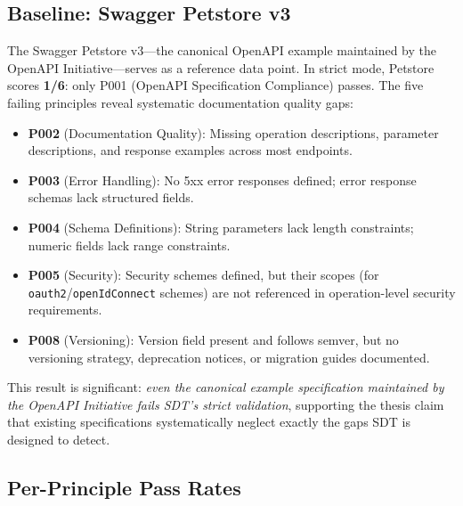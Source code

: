 \subsection{Baseline: Swagger Petstore v3}
\label{subsec:petstore-baseline}

The Swagger Petstore v3---the canonical OpenAPI example maintained by the OpenAPI Initiative---serves as a reference data point. In strict mode, Petstore scores \textbf{1/6}: only P001 (OpenAPI Specification Compliance) passes. The five failing principles reveal systematic documentation quality gaps:

\begin{itemize}
    \item \textbf{P002} (Documentation Quality): Missing operation descriptions, parameter descriptions, and response examples across most endpoints.
    \item \textbf{P003} (Error Handling): No 5xx error responses defined; error response schemas lack structured fields.
    \item \textbf{P004} (Schema Definitions): String parameters lack length constraints; numeric fields lack range constraints.
    \item \textbf{P005} (Security): Security schemes defined, but their scopes (for \texttt{oauth2}/\texttt{openIdConnect} schemes) are not referenced in operation-level security requirements.
    \item \textbf{P008} (Versioning): Version field present and follows semver, but no versioning strategy, deprecation notices, or migration guides documented.
\end{itemize}

This result is significant: \textit{even the canonical example specification maintained by the OpenAPI Initiative fails SDT's strict validation}, supporting the thesis claim that existing specifications systematically neglect exactly the gaps SDT is designed to detect.

\subsection{Per-Principle Pass Rates}
\label{subsec:pass-rates}

